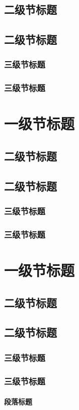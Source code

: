 \documentclass{QHUthesis}
\begin{document}
\subsection{二级节标题}
\subsection{二级节标题}
\subsubsection{三级节标题}
\subsubsection{三级节标题}
\section{一级节标题}
\subsection{二级节标题}
\subsection{二级节标题}
\subsubsection{三级节标题}
\subsubsection{三级节标题}
\section{一级节标题}
\subsection{二级节标题}
\subsection{二级节标题}
\subsubsection{三级节标题}
\subsubsection{三级节标题}
\paragraph{段落标题}
\end{document}
